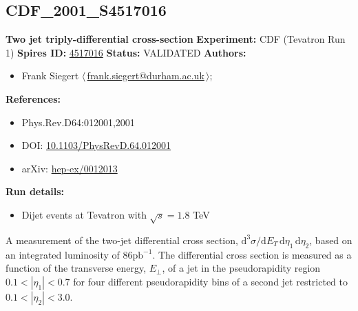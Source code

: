 \subsection{CDF\_2001\_S4517016}
\textbf{Two jet triply-differential cross-section}\newline
\textbf{Experiment:} CDF (Tevatron Run 1) \newline
\textbf{Spires ID:} \href{http://www.slac.stanford.edu/spires/find/hep/www?rawcmd=key+4517016}{4517016}\newline
\textbf{Status:} VALIDATED\newline
\textbf{Authors:}
\begin{itemize}
  \item Frank Siegert $\langle\,$\href{mailto:frank.siegert@durham.ac.uk}{frank.siegert@durham.ac.uk}$\,\rangle$;
\end{itemize}
\textbf{References:}
\begin{itemize}
  \item Phys.Rev.D64:012001,2001
  \item DOI: \href{http://dx.doi.org/10.1103/PhysRevD.64.012001}{10.1103/PhysRevD.64.012001}
  \item arXiv: \href{http://arxiv.org/abs/hep-ex/0012013}{hep-ex/0012013}
\end{itemize}
\textbf{Run details:}
\begin{itemize}

  \item Dijet events at Tevatron with $\sqrt{s}=1.8$ TeV\end{itemize}

\noindent A measurement of the two-jet differential cross section,  $\mathrm{d}^3\sigma/\mathrm{d}E_T \, \mathrm{d}\eta_1 \, \mathrm{d}\eta_2$, based on an integrated luminosity of $86 \mathrm{pb}^{-1}$. The differential cross section is measured as a function of the transverse energy, $E_\perp$, of a jet in the pseudorapidity region $0.1 < |\eta_1| < 0.7$ for four different pseudorapidity bins of a second jet restricted to $0.1 < |\eta_2| < 3.0$.

\clearpage


\clearpage


